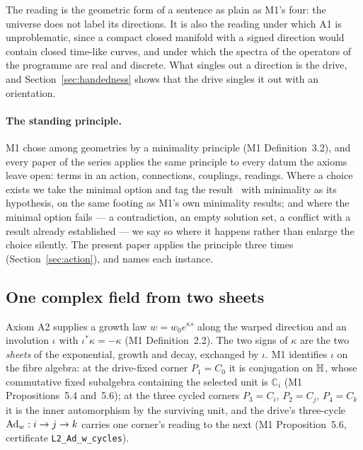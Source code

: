 The reading is the geometric form of a sentence as plain as M1's four: the
universe does not label its directions. It is also the reading under which
A1 is unproblematic, since a compact closed manifold with a signed direction
would contain closed time-like curves, and under which the spectra of the
operators of the programme are real and discrete. What singles out a
direction is the drive, and Section~\ref{sec:handedness} shows that the drive
singles it out with an orientation. \rigD

\paragraph{The standing principle.}
M1 chose among geometries by a minimality principle (M1 Definition~3.2),
and every paper of the series applies the same principle to every datum
the axioms leave open: terms in an action, connections, couplings,
readings. Where a choice exists we take the minimal option and tag the
result \rigD\ with minimality as its hypothesis, on the same footing as
M1's own minimality results; and where the minimal option fails --- a
contradiction, an empty solution set, a conflict with a result already
established --- we say so where it happens rather than enlarge the choice
silently. The present paper applies the principle three times
(Section~\ref{sec:action}), and names each instance.

\subsection{One complex field from two sheets}\label{sec:field}

Axiom A2 supplies a growth law $w=w_{0}e^{\kappa s}$ along the warped
direction and an involution $\iota$ with $\iota^{*}\kappa=-\kappa$
(M1 Definition~2.2). The two signs of $\kappa$ are the two \emph{sheets} of
the exponential, growth and decay, exchanged by $\iota$. M1 identifies
$\iota$ on the fibre algebra: at the drive-fixed corner $P_{1}=C_{0}$ it is
conjugation on $\mathbb{H}$, whose commutative fixed subalgebra containing the
selected unit is $\mathbb{C}_{i}$ (M1 Propositions~5.4 and~5.6); at the three
cycled corners $P_{3}=C_{i}$, $P_{2}=C_{j}$, $P_{4}=C_{k}$ it is the inner
automorphism by the surviving unit, and the drive's three-cycle
$\operatorname{Ad}_{w}:i\to j\to k$ carries one corner's reading to the next
(M1 Proposition~5.6, certificate \texttt{L2\_Ad\_w\_cycles}).

